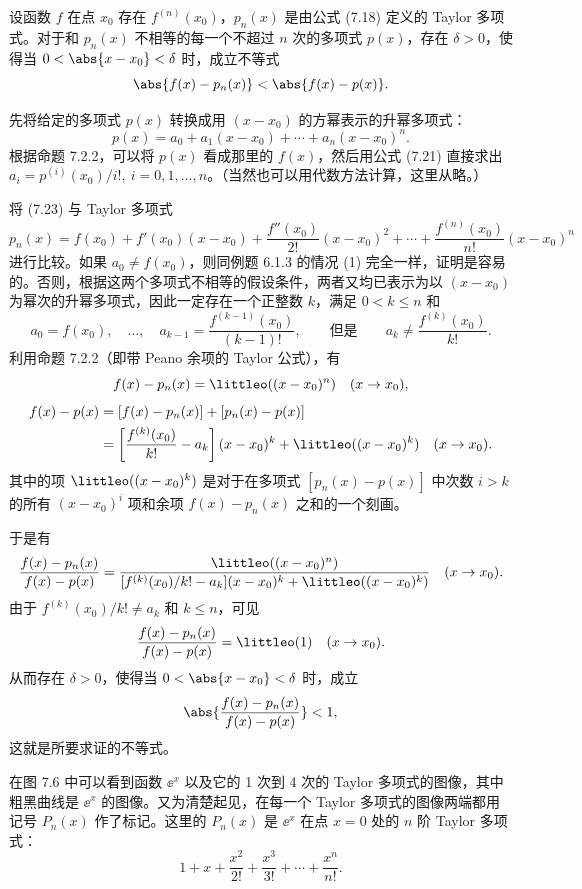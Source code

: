 \begin{xproposition}
设函数 $f$ 在点 $x_0$ 存在 $f^{(n)}(x_0)$，$p_n(x)$ 是由公式 (7.18) 定义的 Taylor 多项式。对于和 $p_n(x)$ 不相等的每一个不超过 $n$ 次的多项式 $p(x)$，存在 $\delta>0$，使得当 $0<\abs{x-x_0}<\delta$ 时，成立不等式
\[
  \abs{f(x)-p_n(x)}<\abs{f(x)-p(x)}.
\]
\end{xproposition}
\begin{xproof}
先将给定的多项式 $p(x)$ 转换成用 $(x-x_0)$ 的方幂表示的升幂多项式：
\begin{equation}
  p(x)=a_0+a_1(x-x_0)+\cdots+a_n(x-x_0)^n.
  \tag{7.23}
\end{equation}
根据命题 7.2.2，可以将 $p(x)$ 看成那里的 $f(x)$，然后用公式 (7.21) 直接求出 $a_i=p^{(i)}(x_0)/i!,\ i=0,1,\ldots,n$。（当然也可以用代数方法计算，这里从略。）

将 (7.23) 与 Taylor 多项式
\[
  p_n(x)=f(x_0)+f'(x_0)(x-x_0)+\frac{f''(x_0)}{2!}(x-x_0)^2+\cdots+\frac{f^{(n)}(x_0)}{n!}(x-x_0)^n
\]
进行比较。如果 $a_0\neq f(x_0)$，则同例题 6.1.3 的情况 (1) 完全一样，证明是容易的。否则，根据这两个多项式不相等的假设条件，两者又均已表示为以 $(x-x_0)$ 为幂次的升幂多项式，因此一定存在一个正整数 $k$，满足 $0<k\leqslant n$ 和
\[
  a_0=f(x_0),\quad\ldots,\quad a_{k-1}=\frac{f^{(k-1)}(x_0)}{(k-1)!},
  \qquad\text{但是}\qquad
  a_k\neq\frac{f^{(k)}(x_0)}{k!}.
\]
利用命题 7.2.2（即带 Peano 余项的 Taylor 公式），有
\[
  f(x)-p_n(x)=\littleo((x-x_0)^n)\quad(x\to x_0),
\]
\[
  \begin{aligned}
  f(x)-p(x)
  &=[f(x)-p_n(x)]+[p_n(x)-p(x)]\\
  &=\left[\frac{f^{(k)}(x_0)}{k!}-a_k\right](x-x_0)^k+\littleo((x-x_0)^k)\quad(x\to x_0).
  \end{aligned}
\]
其中的项 $\littleo((x-x_0)^k)$ 是对于在多项式 $[p_n(x)-p(x)]$ 中次数 $i>k$ 的所有 $(x-x_0)^i$ 项和余项 $f(x)-p_n(x)$ 之和的一个刻画。

于是有
\[
  \frac{f(x)-p_n(x)}{f(x)-p(x)}
  =\frac{\littleo((x-x_0)^n)}{[f^{(k)}(x_0)/k!-a_k](x-x_0)^k+\littleo((x-x_0)^k)}\quad(x\to x_0).
\]
由于 $f^{(k)}(x_0)/k!\neq a_k$ 和 $k\leqslant n$，可见
\[
  \frac{f(x)-p_n(x)}{f(x)-p(x)}=\littleo(1)\quad(x\to x_0).
\]
从而存在 $\delta>0$，使得当 $0<\abs{x-x_0}<\delta$ 时，成立
\[
  \abs{\frac{f(x)-p_n(x)}{f(x)-p(x)}}<1,
\]
这就是所要求证的不等式。
\end{xproof}

在图 7.6 中可以看到函数 $\ee^x$ 以及它的 1 次到 4 次的 Taylor 多项式的图像，其中粗黑曲线是 $\ee^x$ 的图像。又为清楚起见，在每一个 Taylor 多项式的图像两端都用记号 $P_n(x)$ 作了标记。这里的 $P_n(x)$ 是 $\ee^x$ 在点 $x=0$ 处的 $n$ 阶 Taylor 多项式：
\[
  1+x+\frac{x^2}{2!}+\frac{x^3}{3!}+\cdots+\frac{x^n}{n!}.
\]

